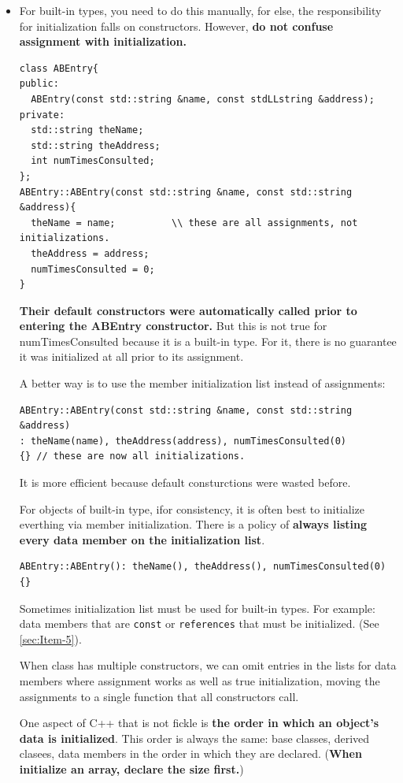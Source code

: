 \documentclass[a4paper,twoside]{article}
\theoremstyle{definition}
\theoremstyle{remark}
\numberwithin{equation}{section}
\let\OldTexttt\texttt
\renewcommand{\texttt}[1]{{\color{blue} \OldTexttt{#1}}}
\begin{document}
\begin{itemize}
\item For built-in types, you need to do this manually, for else,
the responsibility for initialization falls on constructors. However,
\textbf{do not confuse assignment with initialization.}
\begin{verbatim}
class ABEntry{
public:
  ABEntry(const std::string &name, const stdLLstring &address);
private:
  std::string theName;
  std::string theAddress;
  int numTimesConsulted;
};
ABEntry::ABEntry(const std::string &name, const std::string &address){
  theName = name;          \\ these are all assignments, not initializations.
  theAddress = address;
  numTimesConsulted = 0;
}
\end{verbatim}
\textbf{Their default constructors were automatically called prior to entering
the ABEntry constructor. }But this is not true for numTimesConsulted
because it is a built-in type. For it, there is no guarantee it was
initialized at all prior to its assignment.

A better way is to use the member initialization list instead of
assignments:
\begin{verbatim}
ABEntry::ABEntry(const std::string &name, const std::string &address)
: theName(name), theAddress(address), numTimesConsulted(0)
{} // these are now all initializations.
\end{verbatim}
It is more efficient because default consturctions were wasted before.

For objects of built-in type, ifor consistency, it is often best to
initialize everthing via member initialization. There is a policy of
\textbf{always listing every data member on the initialization list}.
\begin{verbatim}
ABEntry::ABEntry(): theName(), theAddress(), numTimesConsulted(0)
{}
\end{verbatim}
Sometimes initialization list must be used for built-in types. For
example: data members that are \texttt{const} or \texttt{references}
that must be initialized. (See \ref{sec:Item-5}).

When class has multiple constructors, we can omit entries in the lists
for data members where assignment works as well as true
initialization, moving the assignments to a single function that all
constructors call.

One aspect of C++ that is not fickle is \textbf{the order in which an
  object's data is initialized}. This order is always the same: base
classes, derived clasees, data members in the order in which they are
declared. (\textbf{When initialize an array, declare the size first.})


\end{itemize}
\end{document}
